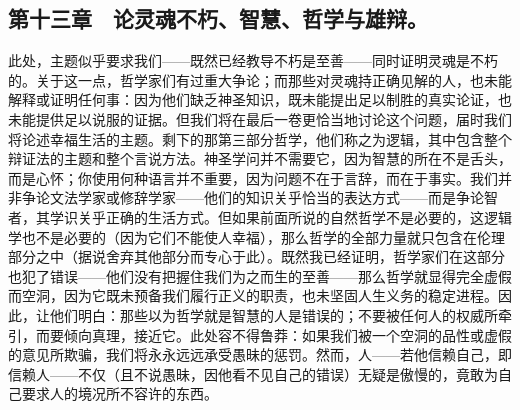 
\subsection{第十三章　论灵魂不朽、智慧、哲学与雄辩。}

此处，主题似乎要求我们——既然已经教导不朽是至善——同时证明灵魂是不朽的。关于这一点，哲学家们有过重大争论；而那些对灵魂持正确见解的人，也未能解释或证明任何事：因为他们缺乏神圣知识，既未能提出足以制胜的真实论证，也未能提供足以说服的证据。但我们将在最后一卷更恰当地讨论这个问题，届时我们将论述幸福生活的主题。剩下的那第三部分哲学，他们称之为逻辑，其中包含整个辩证法的主题和整个言说方法。神圣学问并不需要它，因为智慧的所在不是舌头，而是心怀；你使用何种语言并不重要，因为问题不在于言辞，而在于事实。我们并非争论文法学家或修辞学家——他们的知识关乎恰当的表达方式——而是争论智者，其学识关乎正确的生活方式。但如果前面所说的自然哲学不是必要的，这逻辑学也不是必要的（因为它们不能使人幸福），那么哲学的全部力量就只包含在伦理部分之中（据说舍弃其他部分而专心于此）。既然我已经证明，哲学家们在这部分也犯了错误——他们没有把握住我们为之而生的至善——那么哲学就显得完全虚假而空洞，因为它既未预备我们履行正义的职责，也未坚固人生义务的稳定进程。因此，让他们明白：那些以为哲学就是智慧的人是错误的；不要被任何人的权威所牵引，而要倾向真理，接近它。此处容不得鲁莽：如果我们被一个空洞的品性或虚假的意见所欺骗，我们将永永远远承受愚昧的惩罚。然而，人——若他信赖自己，即信赖人——不仅（且不说愚昧，因他看不见自己的错误）无疑是傲慢的，竟敢为自己要求人的境况所不容许的东西。\par

